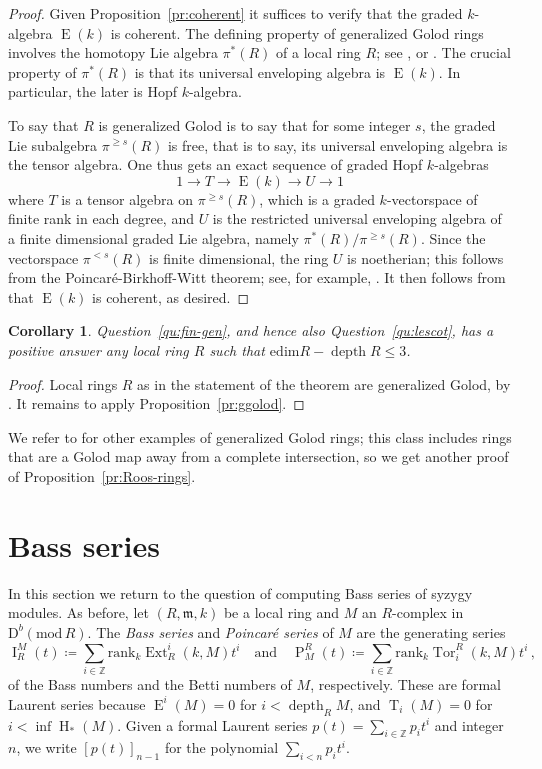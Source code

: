 \documentclass{amsart}
\numberwithin{equation}{section}
\theoremstyle{plain}
\newtheorem{corollary}[equation]{Corollary}
\theoremstyle{definition}
\theoremstyle{remark}
\newcommand{\dbcat}[1]{\mathrm{D}^b(\mathrm{mod}\,{#1})}
\newcommand{\bbZ}{\mathbb{Z}}
\newcommand{\bass}{\operatorname{I}}
\newcommand{\betti}{\operatorname{P}}
\newcommand{\depth}{\operatorname{depth}}
\newcommand{\eee}{\operatorname{E}}
\newcommand{\ext}{\operatorname{Ext}}
\newcommand{\hh}{\operatorname{H}}
\newcommand{\rank}{\mathrm{rank}}
\newcommand{\tee}{\operatorname{T}}
\newcommand{\tor}{\operatorname{Tor}}
\newcommand{\fm}{\mathfrak{m}}
\begin{document}
\begin{proof}
Given Proposition~\ref{pr:coherent} it suffices to verify that the graded $k$-algebra $\eee(k)$ is coherent. The defining property of generalized Golod rings involves the homotopy Lie algebra $\pi^*(R)$ of a local ring $R$; see \cite[1.7]{Avramov:1994a}, or \cite[\S10.2]{Avramov:1998a}. The crucial property of $\pi^*(R)$ is that its universal enveloping algebra is $\eee(k)$. In particular, the later is Hopf $k$-algebra.

To say that $R$ is generalized Golod is to say that for some integer $s$, the graded Lie subalgebra $\pi^{\geqslant s}(R)$ is free, that is to say, its universal enveloping algebra is the tensor algebra. One thus gets an exact sequence of graded Hopf $k$-algebras 
\[
1\longrightarrow T \longrightarrow \eee(k) \longrightarrow U\longrightarrow 1
\]
where $T$ is a tensor algebra on $\pi^{\geqslant s}(R)$, which is a graded $k$-vectorspace of finite rank in each degree, and $U$ is the restricted universal enveloping algebra of a finite dimensional graded Lie algebra, namely $\pi^*(R)/\pi^{\geqslant s}(R)$. Since the vectorspace $\pi^{<s}(R)$ is finite dimensional, the ring $U$ is noetherian; this follows from the Poincar\'e-Birkhoff-Witt theorem; see, for example, \cite[Corollary~2.3.8]{Dixmier:1996s}. It then follows from \cite[Theorem~3]{Roos:1982b} that $\eee(k)$ is coherent, as desired.
\end{proof}


\begin{corollary}
\label{co:ggolod}
Question~\ref{qu:fin-gen}, and hence also Question~\ref{qu:lescot}, has a positive answer any local ring $R$ such that $\mathrm{edim} R - \depth R\le 3$.    
\end{corollary}

\begin{proof}
Local rings $R$ as in the statement of the theorem are generalized Golod, by \cite{Avramov/Kustin/Miller:1988}. It remains to apply Proposition~\ref{pr:ggolod}.
\end{proof}

We refer to \cite{Avramov:1994a} for other examples of generalized Golod rings; this class includes rings that are a Golod map away from a complete intersection, so we get another proof of Proposition~\ref{pr:Roos-rings}.


\section{Bass series}
\label{se:BassSeries}
In this section we return to the question of computing Bass series of syzygy modules. As before, let $(R,\fm,k)$ be a local ring and $M$ an $R$-complex in $\dbcat R$.  The \emph{Bass series} and \emph{Poincar\'e series} of $M$ are the generating series 
\[
\bass_R^M(t)\coloneqq \sum_{i\in\bbZ}\rank_k\ext^i_R(k,M)t^i\quad\text{and}\quad \betti^R_M(t) \coloneqq \sum_{i\in\bbZ}\rank_k\tor^R_i(k,M)t^i\,,
\]
of the Bass numbers and the Betti numbers of $M$, respectively. These are formal Laurent series because $\eee^i(M)=0$ for $i<\depth_RM$, and $\tee_i(M)=0$ for $i<\inf\hh_*(M)$.
Given a formal Laurent series $p(t)=\sum_{i\in\bbZ} p_it^i$ and integer $n$, we write $[p(t)]_{n-1}$ for the polynomial $\sum_{i<n}p_it^i$.
\end{document}
